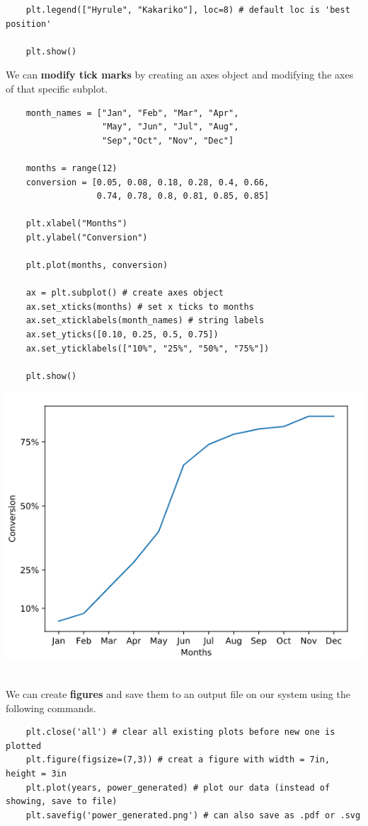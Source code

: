 \documentclass[11pt, a4paper]{article}
\begin{document}
\begin{spacing}{1.1}
\begin{lstlisting}
	plt.legend(["Hyrule", "Kakariko"], loc=8) # default loc is 'best position'
	
	plt.show() \end{lstlisting}\vspace*{1mm}
	We can \textbf{modify tick marks} by creating an axes object and modifying the axes of that specific subplot.
	\begin{minipage}[c]{10cm}
	\begin{lstlisting}
	month_names = ["Jan", "Feb", "Mar", "Apr", 
	               "May", "Jun", "Jul", "Aug", 
	               "Sep","Oct", "Nov", "Dec"]
		
	months = range(12)
	conversion = [0.05, 0.08, 0.18, 0.28, 0.4, 0.66, 
		          0.74, 0.78, 0.8, 0.81, 0.85, 0.85]
		
	plt.xlabel("Months")
	plt.ylabel("Conversion")
		
	plt.plot(months, conversion)
		
	ax = plt.subplot() # create axes object
	ax.set_xticks(months) # set x ticks to months
	ax.set_xticklabels(month_names) # string labels
	ax.set_yticks([0.10, 0.25, 0.5, 0.75])
	ax.set_yticklabels(["10%", "25%", "50%", "75%"])
		
	plt.show() \end{lstlisting}\vspace*{1mm}
	\end{minipage}
	\begin{minipage}[c]{7cm}
		\includegraphics[scale=.52]{ticks}
	\end{minipage} \\
	We can create \textbf{figures} and save them to an output file on our system using the following commands.
	\begin{lstlisting}
	plt.close('all') # clear all existing plots before new one is plotted
	plt.figure(figsize=(7,3)) # creat a figure with width = 7in, height = 3in
	plt.plot(years, power_generated) # plot our data (instead of showing, save to file)
	plt.savefig('power_generated.png') # can also save as .pdf or .svg \end{lstlisting} \newpage


\end{spacing}
\end{document}
